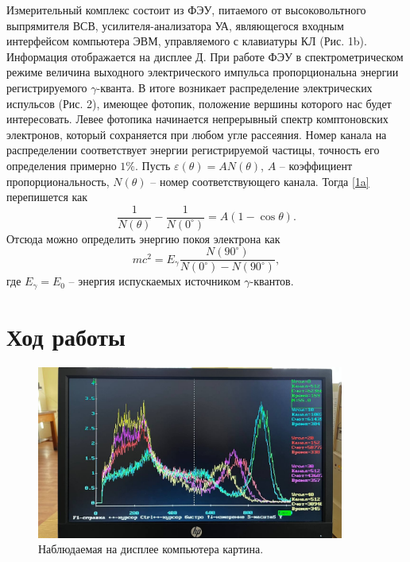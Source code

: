 \documentclass[a4paper,12pt]{article}
\theoremstyle{definition}
\begin{document}
Измерительный комплекс состоит из ФЭУ, питаемого от высоковольтного выпрямителя ВСВ, усилителя-анализатора УА, являющегося входным интерфейсом компьютера ЭВМ, управляемого с клавиатуры КЛ (Рис. 1b). Информация отображается на дисплее Д. При работе ФЭУ в спектрометрическом режиме величина выходного электрического импульса пропорциональна энергии регистрируемого $\gamma$-кванта. В итоге возникает распределение электрических испульсов (Рис. 2), имеющее фотопик, положение вершины которого нас будет интересовать. Левее фотопика начинается непрерывный спектр комптоновских электронов, который сохраняется при любом угле рассеяния. Номер канала на распределении соответствует энергии регистрируемой частицы, точность его определения примерно $1\%$.
\newpage
Пусть $\varepsilon(\theta) = AN(\theta)$, $A$ -- коэффициент пропорциональность, $N(\theta)$ -- номер соответствующего канала. Тогда \eqref{1a} перепишется как
\[\tag{1b}\label{1b}
\dfrac{1}{N(\theta)} - \dfrac{1}{N(0^\circ)} = A(1-\cos \theta).\]
Отсюда можно определить энергию покоя электрона как 
\begin{equation}\label{2}
mc^2 = E_\gamma \dfrac{N(90^\circ)}{N(0^\circ) - N(90^\circ)},
\end{equation}
где $E_\gamma = E_0$ -- энергия испускаемых источником $\gamma$-квантов.

\section{Ход работы}

\begin{figure}[H]
	\centering
	\includegraphics[width = 0.9\textwidth]{4.jpg}
	\caption{Наблюдаемая на дисплее компьютера картина.} \label{computer}
\end{figure}
\end{document}
